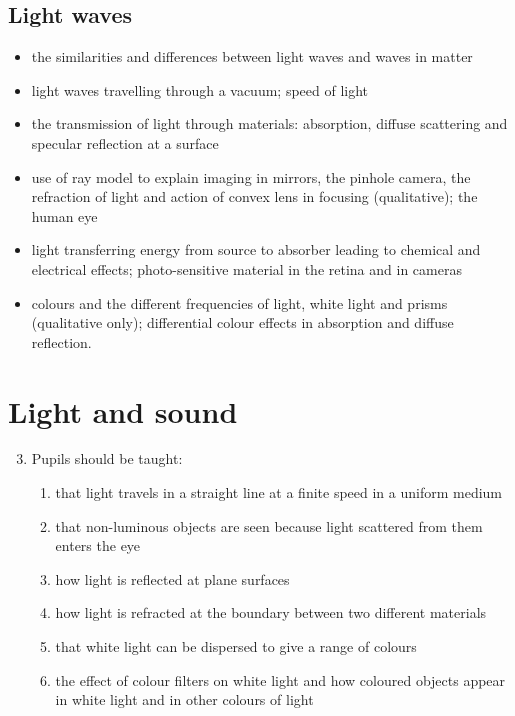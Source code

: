 \documentclass[10pt]{article}
\begin{document}
\begin{paracol}{2}
\subsection{Light waves}
\begin{itemize}
\item the similarities and differences between light waves and waves in matter
\item light waves travelling through a vacuum; speed of light
\item the transmission of light through materials: absorption, diffuse scattering and specular
reflection at a surface
\item use of ray model to explain imaging in mirrors, the pinhole camera, the refraction of
light and action of convex lens in focusing (qualitative); the human eye
\item light transferring energy from source to absorber leading to chemical and electrical
effects; photo-sensitive material in the retina and in cameras
\item colours and the different frequencies of light, white light and prisms (qualitative only);
differential colour effects in absorption and diffuse reflection.
\end{itemize}

\switchcolumn

\section{Light and sound}
\begin{enumerate}
\setcounter{enumi}{2}
\item Pupils should be taught:
\begin{enumerate}
\subsection{The behaviour of light}
\item that light travels in a straight line at a finite speed in a uniform medium
\item that non-luminous objects are seen because light scattered from them 
enters the eye
\item how light is reflected at plane surfaces
\item how light is refracted at the boundary between two different materials
\item that white light can be dispersed to give a range of colours
\item the effect of colour filters on white light and how coloured objects appear 
in white light and in other colours of light

\end{enumerate}
\end{enumerate}
\end{paracol}
\end{document}
